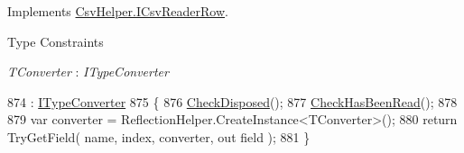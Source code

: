 Implements \hyperlink{a00091_a8ecc5b03e5e818163aca86b979b01158}{Csv\-Helper.\-I\-Csv\-Reader\-Row}.

\begin{Desc}
\item[Type Constraints]\begin{description}
\item[{\em T\-Converter} : {\em I\-Type\-Converter}]\end{description}
\end{Desc}

\begin{DoxyCode}
874                                                                                                            
          : \hyperlink{a00099}{ITypeConverter}
875         \{
876             \hyperlink{a00057_a6fa45a46ed1322dc1872ca2321b5edbc}{CheckDisposed}();
877             \hyperlink{a00057_a2d9249171ed1568e45d152766d364c31}{CheckHasBeenRead}();
878 
879             var converter = ReflectionHelper.CreateInstance<TConverter>();
880             \textcolor{keywordflow}{return} TryGetField( name, index, converter, out field );
881         \}
\end{DoxyCode}


